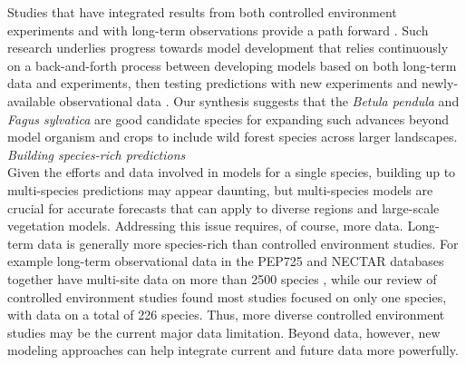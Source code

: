\documentclass[11pt,letter]{article}
\begin{document}
Studies that have integrated results from both controlled environment experiments and with long-term observations provide a path forward \citep{Caffarra:2011qf,satake2013,chuinearees}. Such research underlies progress towards model development that relies continuously on a back-and-forth process between developing models based on both long-term data and experiments, then testing predictions with new experiments and newly-available observational data \citep[i.e., more years and also data from new locations,][]{satake2013}. Our synthesis suggests that the \emph{Betula pendula} and \emph{Fagus sylvatica} are good candidate species for expanding such advances beyond model organism and crops to include wild forest species across larger landscapes.\\ %

\emph{Building species-rich predictions}\\
Given the efforts and data involved in models for a single species, building up to multi-species predictions may appear daunting, but multi-species models are crucial for accurate forecasts that can apply to diverse regions and large-scale vegetation models. Addressing this issue requires, of course, more data. Long-term data is generally more species-rich than controlled environment studies. For example long-term observational data in the PEP725 and NECTAR databases together have multi-site data on more than 2500 species \citep{nectar,Templ2018}, while our review of controlled environment studies found most studies focused on only one species, with data on a total of 226 species. Thus, more diverse controlled environment studies may be the current major data limitation. Beyond data, however, new modeling approaches can help integrate current and future data more powerfully. \\
\end{document}
